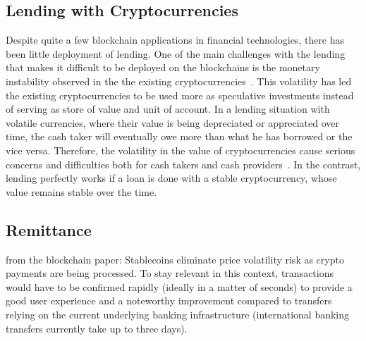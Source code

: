 \subsection{Lending with Cryptocurrencies}
Despite quite a few blockchain applications in financial technologies, there has been little deployment of lending. One of the main challenges with the lending that makes it difficult to be deployed on the blockchains is the monetary instability observed in the the existing cryptocurrencies~\cite{okoyetoward}. This volatility has led the existing cryptocurrencies to be used more as speculative investments instead of serving as store of value and unit of account. In a lending situation with volatile currencies, where their value is being depreciated or appreciated over time, the cash taker will eventually owe more than what he has borrowed or the vice versa. Therefore, the volatility in the value of cryptocurrencies cause serious concerns and difficulties both for cash takers and cash providers~\cite{okoyetoward}. In the contrast, lending perfectly works if a loan is done with a stable cryptocurrency, whose value remains stable over the time.

%

\subsection{Remittance}
from the blockchain paper:
Stablecoins eliminate price volatility risk as crypto payments are being processed. To stay relevant in this
context, transactions would have to be confirmed rapidly (ideally in a matter of seconds) to provide a good
user experience and a noteworthy improvement compared to transfers relying on the current underlying
banking infrastructure (international banking transfers currently take up to three days).

